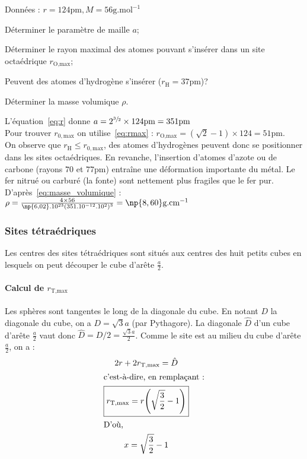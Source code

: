 \begin{ex}
    Données : $r = 124\text{pm}, M = 56\text{g.mol}^{-1}$
    \begin{compactitem}
        \item Déterminer le paramètre de maille $a$;
        \item Déterminer le rayon maximal des atomes pouvant s'insérer dans un
            site octaédrique $r_{\text{O,max}}$;
        \item Peuvent des atomes d'hydrogène s'insérer ($r_{\text{H}} = 37$pm)?
        \item Déterminer la masse volumique $\rho$.
    \end{compactitem}
    L'équation~\ref{eq:r} donne
    $a=2^{\sfrac{3}{2}} \times 124\text{pm} = 351\text{pm}$\\
    Pour trouver $r_{0,\text{max}}$ on utilise~\ref{eq:rmax} :
    $r_{\text{O,max}} = (\sqrt{2} - 1)\times 124 = 51\text{pm}$.\\
    On observe que $r_{\text{H}} \leq r_{0,\text{max}}$, des atomes
    d'hydrogènes peuvent donc se positionner dans les sites
    octaédriques. En revanche, l'insertion d'atomes d'azote ou de
    carbone (rayons $70$ et $77$pm) entraîne une déformation importante
    du métal. Le fer nitrué ou carburé (la fonte) sont nettement
    plus fragiles que le fer pur.
    D'après~\ref{eq:masse_volumique} :
    $\rho = \frac{4 \times 56}{\np{6,02}.10^{23}(351.10^{-12}.10^2)^3} = \np{8,60}\text{g.cm}^{-1}$
\end{ex}

\subsubsection{Sites tétraédriques}
Les centres des sites tétraédriques sont situés aux centres des
huit petits cubes en lesquels on peut découper le cube d’arête
$\frac{a}{2}$.
\paragraph{Calcul de $r_{\text{T,max}}$}
Les sphères sont tangentes le long de la diagonale du cube.
En notant $D$ la diagonale du cube, on a $D = \sqrt{3}a$
(par Pythagore). La diagonale $\hat{D}$ d'un cube d'arête $\frac{a}{2}$
vaut donc $\hat{D} = D/2 = \frac{\sqrt{3}a}{2}$.
Comme le site est au milieu du cube d'arête $\frac{a}{2}$, on a :
\begin{gather}
    2r + 2r_{\text{T,max}} = \hat{D}\\
    \intertext{c'est-à-dire, en remplaçant :}
    \boxed{r_{\text{T,max}} = r\Biggl(\sqrt{\frac{3}{2}} - 1\Biggr)}\label{eq:rmax_tetra}\\
    \intertext{D'où,}
    x = \sqrt{\frac{3}{2}} - 1
\end{gather}


